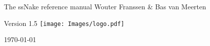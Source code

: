 %
%
%
%

\begin{titlepage}
\begin{center}




{\Huge The ssNake reference manual}
\vfill
\large Wouter Franssen \& Bas van Meerten

\vspace{1cm}
\large Version 1.5
\vfill
\texttt{[image: Images/logo.pdf]}\

\vfill
\vfill
{\large \today}

\end{center}

\end{titlepage}
